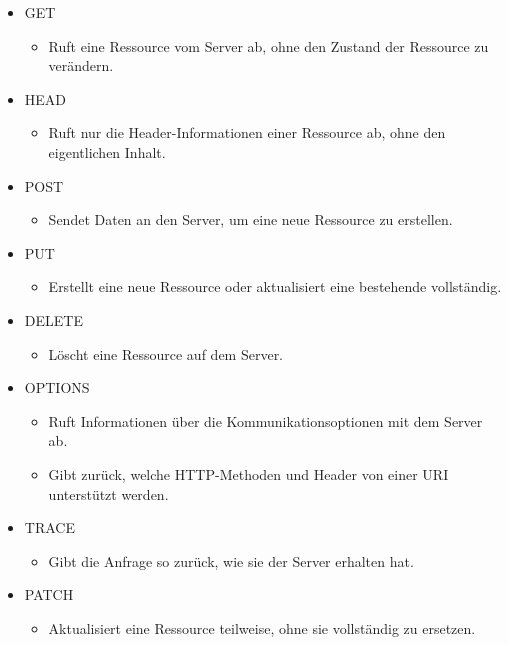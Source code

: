 \documentclass[
    headings=optiontotocandhead,%
    twoside,
    numbers=noenddot,%
    12pt, %
    titlepage, %
    parskip=full, %
    listof=leveldown, 
    numbers=noenddot, %
    a4paper,DIV=14,
    BCOR=15mm,
]{scrbook}
\providecommand{\tightlist}{%
  \setlength{\itemsep}{0pt}\setlength{\parskip}{0pt}}
\begin{document}
\begin{itemize}
\tightlist
\item
  GET

  \begin{itemize}
  \tightlist
  \item
    Ruft eine Ressource vom Server ab, ohne den Zustand der Ressource zu
    verändern.
  \end{itemize}
\item
  HEAD

  \begin{itemize}
  \tightlist
  \item
    Ruft nur die Header-Informationen einer Ressource ab, ohne den
    eigentlichen Inhalt.
  \end{itemize}
\item
  POST

  \begin{itemize}
  \tightlist
  \item
    Sendet Daten an den Server, um eine neue Ressource zu erstellen.
  \end{itemize}
\item
  PUT

  \begin{itemize}
  \tightlist
  \item
    Erstellt eine neue Ressource oder aktualisiert eine bestehende
    vollständig.
  \end{itemize}
\item
  DELETE

  \begin{itemize}
  \tightlist
  \item
    Löscht eine Ressource auf dem Server.
  \end{itemize}
\item
  OPTIONS

  \begin{itemize}
  \tightlist
  \item
    Ruft Informationen über die Kommunikationsoptionen mit dem Server
    ab.
  \item
    Gibt zurück, welche HTTP-Methoden und Header von einer URI
    unterstützt werden.
  \end{itemize}
\item
  TRACE

  \begin{itemize}
  \tightlist
  \item
    Gibt die Anfrage so zurück, wie sie der Server erhalten hat.
  \end{itemize}
\item
  PATCH

  \begin{itemize}
  \tightlist
  \item
    Aktualisiert eine Ressource teilweise, ohne sie vollständig zu
    ersetzen.
  \end{itemize}
\end{itemize}
\end{document}

